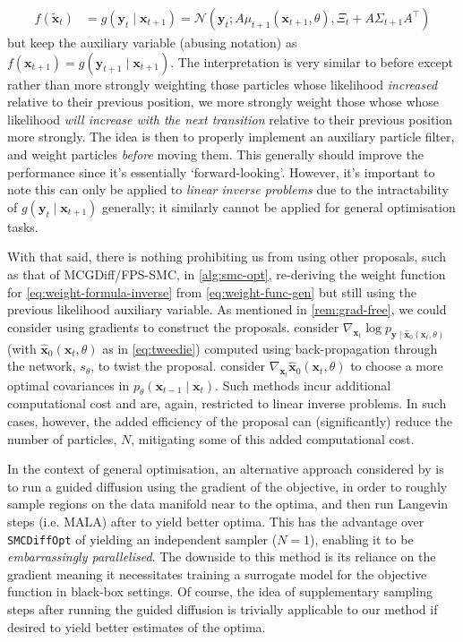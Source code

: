 \begin{align*}
    f(\tilde{\mathbf{x}}_t) &= g(\mathbf{y}_t \mid \mathbf{x}_{t+1}) = \mathcal{N}\left(\mathbf{y}_t; A\mu_{t+1}(\mathbf{x}_{t+1}, \theta), \Xi_t + A\Sigma_{t+1}A^\top\right)
\end{align*}
but keep the auxiliary variable (abusing notation) as
$f(\mathbf{x}_{t+1}) = g(\mathbf{y}_{t+1} \mid \mathbf{x}_{t+1})$. The interpretation is very
similar to before except rather than more strongly weighting those particles whose likelihood
\emph{increased} relative to their previous position, we more strongly weight those whose whose
likelihood \emph{will increase with the next transition} relative to their previous position more
strongly. The idea is then to properly implement an auxiliary particle filter, and weight particles
\emph{before} moving them. This generally should improve the performance since it's essentially
`forward-looking'. However, it's important to note this can only be applied to \emph{linear
inverse problems} due to the intractability of $g(\mathbf{y}_t \mid \mathbf{x}_{t+1})$ generally;
it similarly cannot be applied for general optimisation tasks.

With that said, there is nothing prohibiting us from using other proposals, such as that of
MCGDiff/FPS-SMC, in \autoref{alg:smc-opt}, re-deriving the weight function for
\autoref{eq:weight-formula-inverse} from \autoref{eq:weight-func-gen} but still using the previous
likelihood auxiliary variable. As mentioned in \autoref{rem:grad-free}, we could consider using
gradients to construct the proposals. \textcite{wuPracticalAsymptoticallyExact2023} consider
$\nabla_{\mathbf{x}_t}\log p_{\mathbf{y} \mid \hat{\mathbf{x}}_0(\mathbf{x}_t, \theta)}$ (with
$\hat{\mathbf{x}}_0(\mathbf{x}_t, \theta)$ as in \autoref{eq:tweedie}) computed using back-propagation
through the network, $s_\theta$, to twist the proposal. \textcite{boysTweedieMomentProjected2023}
consider $\nabla_{\mathbf{x}_t}\hat{\mathbf{x}}_0(\mathbf{x}_t, \theta)$ to choose a more optimal
covariances in $p_\theta(\mathbf{x}_{t-1} \mid \mathbf{x}_t)$. Such methods incur additional
computational cost and are, again, restricted to linear inverse problems. In such cases, however,
the added efficiency of the proposal can (significantly) reduce the number of particles, $N$,
mitigating some of this added computational cost.

In the context of general optimisation, an alternative approach considered by
\textcite{kongDiffusionModelsConstrained2024}
is to run a guided diffusion using the gradient of the objective, in order to roughly sample regions
on the data manifold near to the optima, and then run Langevin steps (i.e. MALA) after to yield
better optima. This has the advantage over \texttt{SMCDiffOpt} of yielding an independent sampler
($N=1$), enabling it to be \emph{embarrassingly parallelised}. The downside to this method is its
reliance on the gradient meaning it necessitates training a surrogate model for the objective
function in black-box settings. Of course, the idea of supplementary sampling steps after running
the guided diffusion is trivially applicable to our method if desired to yield better estimates of
the optima.
